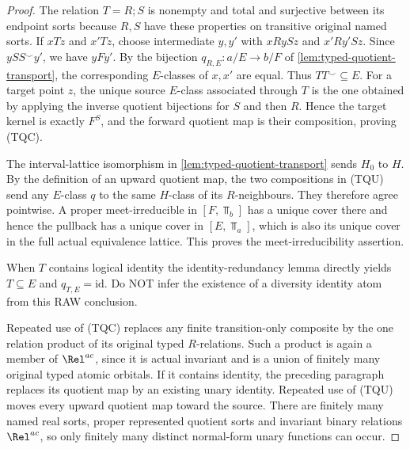 \begin{proof}
The relation \(T=R;S\)
is nonempty and total and
surjective between its
endpoint sorts because
\(R,S\) have these
properties on transitive
original named sorts.
If \(xTz\) and \(x'Tz\),
choose intermediate
\(y,y'\) with
\(xRySz\) and
\(x'Ry'Sz\).
Since \(ySS^\smile y'\),
we have \(yFy'\).
By the bijection
\(q_{R,E}:a/E\to b/F\)
of
\cref{lem:typed-quotient-transport},
the corresponding
\(E\)-classes of \(x,x'\)
are equal. Thus
\(TT^\smile\subseteq E\).
For a target point \(z\),
the unique source
\(E\)-class associated
through \(T\) is the
one obtained by applying
the inverse quotient
bijections for \(S\)
and then \(R\).
Hence the target kernel
is exactly \(F^S\), and
the forward quotient
map is their composition,
proving (TQC).

The interval-lattice
isomorphism in
\cref{lem:typed-quotient-transport}
sends \(H_0\) to \(H\).
By the definition of
an upward quotient map,
the two compositions in
(TQU) send any
\(E\)-class \(q\)
to the same \(H\)-class
of its \(R\)-neighbours.
They therefore agree
pointwise. A proper
meet-irreducible in
\([F,\Top_b]\) has a
unique cover there and
hence the pullback has
a unique cover in
\([E,\Top_a]\), which is
also its unique cover
in the full actual
equivalence lattice.
This proves the
meet-irreducibility
assertion.

When \(T\) contains
logical identity the
identity-redundancy lemma
directly yields
\(T\subseteq E\) and
\(q_{T,E}=\mathrm{id}\).
Do NOT infer the
existence of a
diversity identity atom
from this RAW conclusion.

Repeated use of (TQC)
replaces any finite
transition-only composite
by the one relation
product of its original
typed \(R\)-relations.
Such a product is
again a member of
\(\Rel^{ac}\), since it
is actual invariant
and is a union of
finitely many original
typed atomic orbitals.
If it contains identity,
the preceding paragraph
replaces its quotient map
by an existing unary
identity. Repeated use
of (TQU) moves every
upward quotient map
toward the source.
There are finitely many
named real sorts, proper
represented quotient sorts
and invariant binary
relations \(\Rel^{ac}\),
so only finitely many
distinct normal-form
unary functions can occur.
\end{proof}

